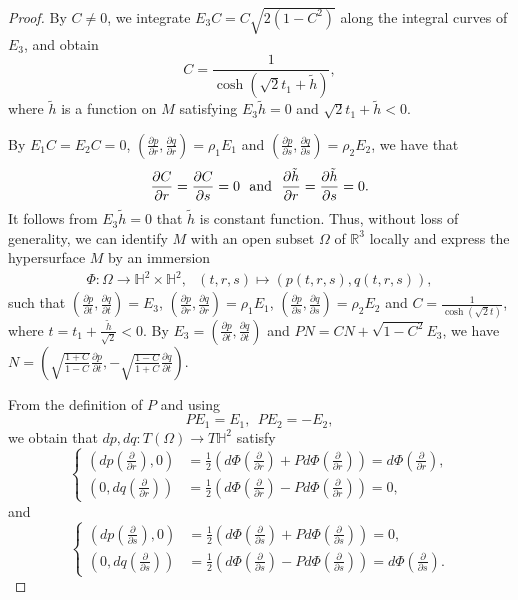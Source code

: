 \documentclass[reqno]{amsart}%
\theoremstyle{definition}
\numberwithin{equation}{section}
\begin{document}
\begin{proof}
By $C\neq0$, we integrate $E_3C=C\sqrt{2(1-C^2)}$ along the integral curves of $E_3$, and obtain
$$
C=\frac{1}{\cosh(\sqrt{2}t_1+\tilde{h})},
$$
where $\tilde{h}$ is a function on $M$ satisfying $E_3\tilde{h}=0$ and
$\sqrt{2}t_1+\tilde{h}<0$.


By $E_1C=E_2C=0$, $(\frac{\partial p}{\partial r},\frac{\partial q}{\partial r})=\rho_1E_1$ and
$(\frac{\partial p}{\partial s},\frac{\partial q}{\partial s})=\rho_2E_2$, we have that
$$
\frac{\partial C}{\partial r}=\frac{\partial C}{\partial s}=0\ \  {\rm and}\ \
\frac{\partial \tilde{h}}{\partial r}=\frac{\partial \tilde{h}}{\partial s}=0.
$$
It follows from $E_3\tilde{h}=0$ that $\tilde{h}$ is constant function. Thus, without loss of generality,
we can identify $M$ with an open subset $\Omega$ of $\mathbb{R}^3$ locally and express the hypersurface $M$ by an immersion
$$
\begin{aligned}
\Phi:\Omega
\longrightarrow\mathbb{H}^2\times\mathbb{H}^2,\ \ \
(t,r,s)\mapsto (p(t,r,s),q(t,r,s)),
\end{aligned}
$$
such that $(\frac{\partial p}{\partial t},\frac{\partial q}{\partial t})=E_3$,
$(\frac{\partial p}{\partial r},\frac{\partial q}{\partial r})=\rho_1E_1$,
$(\frac{\partial p}{\partial s},\frac{\partial q}{\partial s})=\rho_2E_2$ and
$C=\frac{1}{\cosh(\sqrt{2}t)}$, where $t=t_1+\frac{\tilde{h}}{\sqrt{2}}<0$. By $E_3=(\frac{\partial p}{\partial t},\frac{\partial q}{\partial t})$ and
$PN=CN+\sqrt{1-C^2}E_3$, we have $N=(\sqrt{\frac{1+C}{1-C}}\frac{\partial p}{\partial t},-\sqrt{\frac{1-C}{1+C}}\frac{\partial q}{\partial t})$.

From the definition of $P$  and using
$$
PE_1=E_1,\ \ PE_2=-E_2,
$$
we obtain that $dp,dq:T(\Omega)\rightarrow
T\mathbb{H}^2$ satisfy
\begin{equation}\label{eqn:5.49}
\left\{
\begin{aligned}
(dp(\tfrac{\partial}{\partial r}),0)&=\tfrac{1}{2}(d\Phi(\tfrac{\partial}{\partial r})+Pd\Phi(\tfrac{\partial}{\partial r}))=d\Phi(\tfrac{\partial}{\partial r}),\\
(0,dq(\tfrac{\partial}{\partial r}))&=\tfrac{1}{2}(d\Phi(\tfrac{\partial}{\partial r})-Pd\Phi(\tfrac{\partial}{\partial r}))=0,
\end{aligned}
\right.
\end{equation}
%
%
and
\begin{equation}\label{eqn:5.50}
\left\{
\begin{aligned}
(dp(\tfrac{\partial}{\partial s}),0)&=\tfrac{1}{2}(d\Phi(\tfrac{\partial}{\partial s})+Pd\Phi(\tfrac{\partial}{\partial s}))=0,\\
(0,dq(\tfrac{\partial}{\partial s}))&=\tfrac{1}{2}(d\Phi(\tfrac{\partial}{\partial s})-Pd\Phi(\tfrac{\partial}{\partial s}))=d\Phi(\tfrac{\partial}{\partial s}).
\end{aligned}
\right.
\end{equation}


\end{proof}
\end{document}
